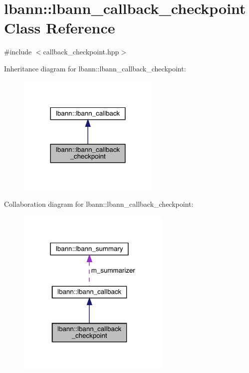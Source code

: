 \hypertarget{classlbann_1_1lbann__callback__checkpoint}{}\section{lbann\+:\+:lbann\+\_\+callback\+\_\+checkpoint Class Reference}
\label{classlbann_1_1lbann__callback__checkpoint}


{\ttfamily \#include $<$callback\+\_\+checkpoint.\+hpp$>$}



Inheritance diagram for lbann\+:\+:lbann\+\_\+callback\+\_\+checkpoint\+:\nopagebreak
\begin{figure}[H]
\begin{center}
\leavevmode
\includegraphics[width=192pt]{classlbann_1_1lbann__callback__checkpoint__inherit__graph}
\end{center}
\end{figure}


Collaboration diagram for lbann\+:\+:lbann\+\_\+callback\+\_\+checkpoint\+:\nopagebreak
\begin{figure}[H]
\begin{center}
\leavevmode
\includegraphics[width=207pt]{classlbann_1_1lbann__callback__checkpoint__coll__graph}
\end{center}
\end{figure}
